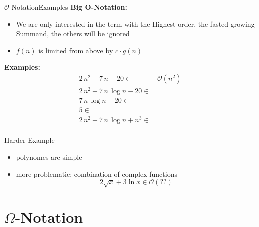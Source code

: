 
\begin{frame}{$\mathcal{O}$-Notation}{Examples}
  \textbf{Big O-Notation:}
  \begin{itemize}
    \item
      We are only interested in the term with the Highest-order, the fasted growing Summand,
      the others will be ignored
    \item
      $f(n)$ is limited {\color{Mittel-Blau}from above} by $c \cdot g(n)$
  \end{itemize}
  \textbf{Examples:}
  \begin{align*}
     2 \, n^2 + 7 \, n - 20 \in & \,\mathcal{O}(n^2) \\
     2 \, n^2 + 7 \, n \, \log n - 20 \in & {}\\
     7 \, n \, \log n - 20 \in & {}\\
     5 \in & {}\\
     2 \, n^2 + 7 \, n \, \log n + n^3 \in & {}\\
  \end{align*}
\end{frame}

\begin{frame}{Harder Example}
  \begin{itemize}
  \item polynomes are simple
  \item more problematic: combination of complex functions
    \begin{displaymath}
           2 \sqrt{x} + 3 \ln x \in \mathcal{O} (??)
    \end{displaymath}
  \end{itemize}
\end{frame}

\section{\texorpdfstring{$\Omega$}{Omega}-Notation}

